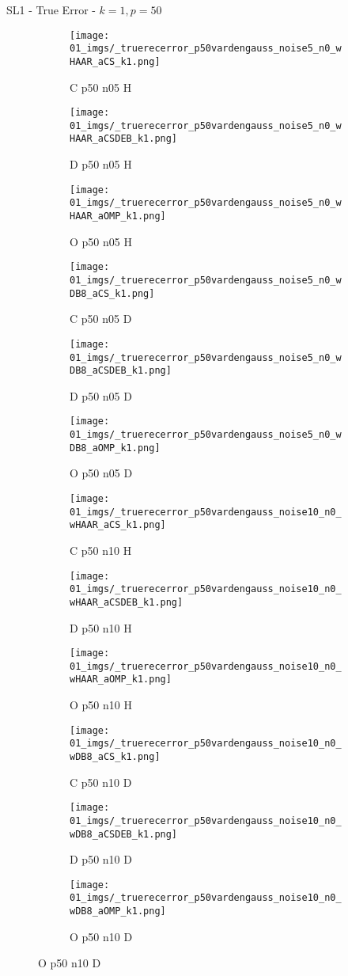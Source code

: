 \begin{frame}{SL1 - True Error - $k=1,p=50$}{}
\begin{figure}
\begin{subfigure}{0.13\textwidth}
\texttt{[image: 01\_imgs/\_truerecerror\_p50vardengauss\_noise5\_n0\_wHAAR\_aCS\_k1.png]}
\caption*{\tiny C p50 n05 H}
\end{subfigure}
\begin{subfigure}{0.13\textwidth}
\texttt{[image: 01\_imgs/\_truerecerror\_p50vardengauss\_noise5\_n0\_wHAAR\_aCSDEB\_k1.png]}
\caption*{\tiny D p50 n05 H}
\end{subfigure}
\begin{subfigure}{0.13\textwidth}
\texttt{[image: 01\_imgs/\_truerecerror\_p50vardengauss\_noise5\_n0\_wHAAR\_aOMP\_k1.png]}
\caption*{\tiny O p50 n05 H}
\end{subfigure}
\begin{subfigure}{0.13\textwidth}
\texttt{[image: 01\_imgs/\_truerecerror\_p50vardengauss\_noise5\_n0\_wDB8\_aCS\_k1.png]}
\caption*{\tiny C p50 n05 D}
\end{subfigure}
\begin{subfigure}{0.13\textwidth}
\texttt{[image: 01\_imgs/\_truerecerror\_p50vardengauss\_noise5\_n0\_wDB8\_aCSDEB\_k1.png]}
\caption*{\tiny D p50 n05 D}
\end{subfigure}
\begin{subfigure}{0.13\textwidth}
\texttt{[image: 01\_imgs/\_truerecerror\_p50vardengauss\_noise5\_n0\_wDB8\_aOMP\_k1.png]}
\caption*{\tiny O p50 n05 D}
\end{subfigure}

\vspace{5pt}

\begin{subfigure}{0.13\textwidth}
\texttt{[image: 01\_imgs/\_truerecerror\_p50vardengauss\_noise10\_n0\_wHAAR\_aCS\_k1.png]}
\caption*{\tiny C p50 n10 H}
\end{subfigure}
\begin{subfigure}{0.13\textwidth}
\texttt{[image: 01\_imgs/\_truerecerror\_p50vardengauss\_noise10\_n0\_wHAAR\_aCSDEB\_k1.png]}
\caption*{\tiny D p50 n10 H}
\end{subfigure}
\begin{subfigure}{0.13\textwidth}
\texttt{[image: 01\_imgs/\_truerecerror\_p50vardengauss\_noise10\_n0\_wHAAR\_aOMP\_k1.png]}
\caption*{\tiny O p50 n10 H}
\end{subfigure}
\begin{subfigure}{0.13\textwidth}
\texttt{[image: 01\_imgs/\_truerecerror\_p50vardengauss\_noise10\_n0\_wDB8\_aCS\_k1.png]}
\caption*{\tiny C p50 n10 D}
\end{subfigure}
\begin{subfigure}{0.13\textwidth}
\texttt{[image: 01\_imgs/\_truerecerror\_p50vardengauss\_noise10\_n0\_wDB8\_aCSDEB\_k1.png]}
\caption*{\tiny D p50 n10 D}
\end{subfigure}
\begin{subfigure}{0.13\textwidth}
\texttt{[image: 01\_imgs/\_truerecerror\_p50vardengauss\_noise10\_n0\_wDB8\_aOMP\_k1.png]}
\caption*{\tiny O p50 n10 D}
\end{subfigure}


\end{figure}
\end{frame}
